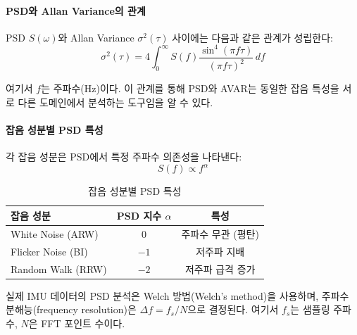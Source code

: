             \paragraph{PSD와 Allan Variance의 관계}
                PSD $S(\omega)$와 Allan Variance $\sigma^2(\tau)$ 사이에는 다음과 같은 관계가 성립한다:\\

                \begin{equation}
                    \sigma^2(\tau) = 4 \int_0^\infty S(f) \frac{\sin^4(\pi f \tau)}{(\pi f \tau)^2}\, df
                    \label{eq:avar_psd_relation}
                \end{equation}

                \noindent 여기서 $f$는 주파수(Hz)이다. 이 관계를 통해 PSD와 AVAR는 동일한 잡음 특성을 서로 다른 도메인에서 분석하는 도구임을 알 수 있다.\\

            \paragraph{잡음 성분별 PSD 특성}
                각 잡음 성분은 PSD에서 특정 주파수 의존성을 나타낸다:\\

                \begin{equation}
                    S(f) \propto f^\alpha
                    \label{eq:psd_slope}
                \end{equation}

                \begin{table}[H]
                    \centering
                    \caption{잡음 성분별 PSD 특성}
                    \label{tab:psd_slopes}
                    \begin{tabular}{lcc}
                        \toprule
                        잡음 성분 & PSD 지수 $\alpha$ & 특성 \\
                        \midrule
                        White Noise (ARW) & $0$ & 주파수 무관 (평탄) \\
                        Flicker Noise (BI) & $-1$ & 저주파 지배 \\
                        Random Walk (RRW) & $-2$ & 저주파 급격 증가 \\
                        \bottomrule
                    \end{tabular}
                \end{table}

                실제 IMU 데이터의 PSD 분석은 Welch 방법(Welch's method)을 사용하며, 주파수 분해능(frequency resolution)은 $\Delta f = f_s / N$으로 결정된다. 여기서 $f_s$는 샘플링 주파수, $N$은 FFT 포인트 수이다.\\


